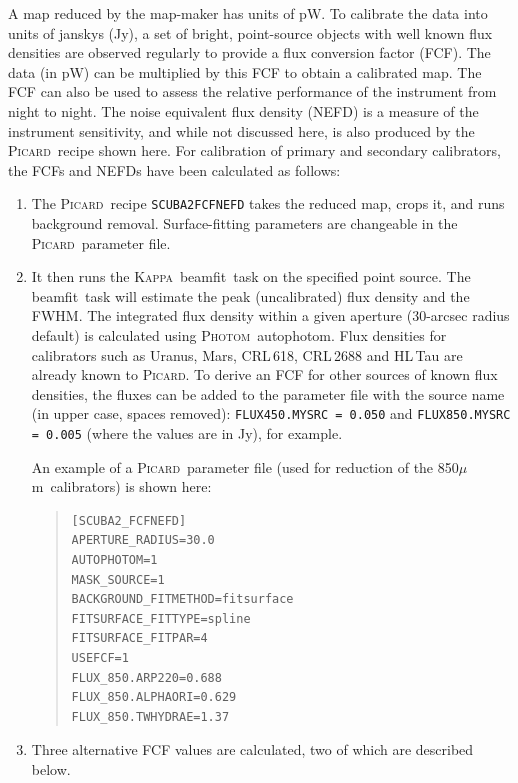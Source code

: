 \documentclass[twoside,11pt]{article}
\newcommand{\xref}[3]{#1}
\renewcommand{\_}{\texttt{\symbol{95}}}
\newcommand{\micron}{\mbox{$\mu$m}}
\newenvironment{myquote}{\begin{quote}\begin{small}}{\end{small}\end{quote}}
\newcommand{\Kappa}{\xref{\textsc{Kappa}}{sun95}{}}
\newcommand{\photom}{\xref{\textsc{Photom}}{sun45}{}}
\newcommand{\picard}{\xref{\textsc{Picard}}{sun265}{}}
\newcommand{\drrecipe}[1]{\texttt{#1}}
\newcommand{\task}[1]{\textsf{#1}}
\newcommand{\beamfit}{\xref{\task{beamfit}}{sun95}{BEAMFIT}}
\newcommand{\autophotom}{\xref{\task{autophotom}}{sun45}{AUTOPHOTOM}}
\begin{document}
A map reduced by the map-maker has units of pW. To calibrate the data
into units of janskys (Jy), a set of bright, point-source objects with
well known flux densities are observed regularly to provide a flux
conversion factor (FCF). The data (in pW) can be multiplied by this FCF
to obtain a calibrated map. The FCF can also be used to assess the
relative performance of the instrument from night to night. The noise
equivalent flux density (NEFD) is a measure of the instrument
sensitivity, and while not discussed here, is also produced by the
\picard\ recipe shown here. For calibration of primary and secondary
calibrators, the FCFs and NEFDs have been calculated as follows:

\begin{enumerate}
\item{The \picard\ recipe \drrecipe{SCUBA2\_FCFNEFD} takes the reduced
  map, crops it, and runs background removal. Surface-fitting
  parameters are changeable in the \picard\ parameter file.}
\item{It then runs the \Kappa\ \beamfit\ task on the specified point
  source. The \beamfit\ task will estimate the peak (uncalibrated)
  flux density and the FWHM. The integrated flux density within a
  given aperture (30-arcsec radius default) is calculated using
  \photom\ \autophotom. Flux densities for calibrators such as Uranus,
  Mars, CRL\,618, CRL\,2688 and HL\,Tau are already known to
  \picard. To derive an FCF for other sources of known flux densities,
  the fluxes can be added to the parameter file with the source name
  (in upper case, spaces removed): \texttt{FLUX\_450.MYSRC = 0.050}
  and \texttt{FLUX\_850.MYSRC = 0.005} (where the values are in Jy),
  for example. }

  An example of a \picard\ parameter file (used for reduction of the
  850\micron\ calibrators) is shown here:

\begin{myquote}
\begin{verbatim}
[SCUBA2_FCFNEFD]
APERTURE_RADIUS=30.0
AUTOPHOTOM=1
MASK_SOURCE=1
BACKGROUND_FITMETHOD=fitsurface
FITSURFACE_FITTYPE=spline
FITSURFACE_FITPAR=4
USEFCF=1
FLUX_850.ARP220=0.688
FLUX_850.ALPHAORI=0.629
FLUX_850.TWHYDRAE=1.37
\end{verbatim}
\end{myquote}

\item {Three alternative FCF values are calculated, two of which are
described below.}
\end{enumerate}
\end{document}
